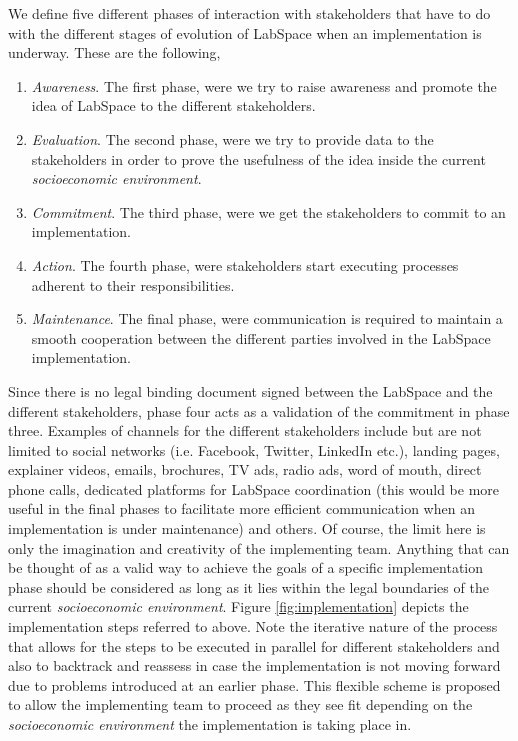 \documentclass[a4paper, 11pt]{article}
\begin{document}
We define five different phases of interaction with stakeholders that have to do with the different stages of evolution of LabSpace when an implementation is underway. These are the following,

\begin{enumerate}[noitemsep]
    \item \textit{Awareness}. The first phase, were we try to raise awareness and promote the idea of LabSpace to the different stakeholders.
    \item \textit{Evaluation}. The second phase, were we try to provide data to the stakeholders in order to prove the usefulness of the idea inside the current \textit{socioeconomic environment}.
    \item \textit{Commitment}. The third phase, were we get the stakeholders to commit to an implementation.
    \item \textit{Action}. The fourth phase, were stakeholders start executing processes adherent to their responsibilities.
    \item \textit{Maintenance}. The final phase, were communication is required to maintain a smooth cooperation between the different parties involved in the LabSpace implementation.
\end{enumerate}

 Since there is no legal binding document signed between the LabSpace and the different stakeholders, phase four acts as a validation of the commitment in phase three. Examples of channels for the different stakeholders include but are not limited to social networks (i.e. Facebook, Twitter, LinkedIn etc.), landing pages, explainer videos, emails, brochures, TV ads, radio ads, word of mouth, direct phone calls, dedicated platforms for LabSpace coordination (this would be more useful in the final phases to facilitate more efficient communication when an implementation is under maintenance) and others. Of course, the limit here is only the imagination and creativity of the implementing team. Anything that can be thought of as a valid way to achieve the goals of a specific implementation phase should be considered as long as it lies within the legal boundaries of the current \textit{socioeconomic environment}. Figure \ref{fig:implementation} depicts the implementation steps referred to above. Note the iterative nature of the process that allows for the steps to be executed in parallel for different stakeholders and also to backtrack and reassess in case the implementation is not moving forward due to problems introduced at an earlier phase. This flexible scheme is proposed to allow the implementing team to proceed as they see fit depending on the \textit{socioeconomic environment} the implementation is taking place in.
\end{document}
